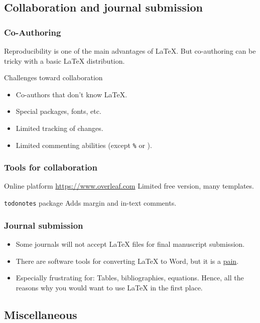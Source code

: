 \documentclass{beamer} %
\begin{document}
\subsection{Collaboration and journal submission}

\begin{frame}
\frametitle{Co-Authoring}
Reproducibility is one of the main advantages of {\LaTeX}. But co-authoring can be tricky with a basic {\LaTeX} distribution.
\begin{block}{Challenges toward collaboration}%
\begin{itemize}
\item Co-authors that don't know {\LaTeX}.
\item Special packages, fonts, etc. 
\item Limited tracking of changes.
\item Limited commenting abilities (except \texttt{\%} or ).
\end{itemize}
\end{block}
\end{frame} 
 
\begin{frame}
\frametitle{Tools for collaboration}
 \begin{block}{Online platform \url{https://www.overleaf.com}}%
Limited free version, many templates.
\end{block}
\begin{block}{\texttt{todonotes} package}
Adds margin and in-text comments.
\end{block}
\end{frame}


\begin{frame}
\frametitle{Journal submission}
\begin{itemize}
\item Some journals will not accept {\LaTeX} files for final manuscript submission. 
\item There are software tools for converting {\LaTeX} to Word, but it is a \underline{pain}.
\item Especially frustrating for: Tables, bibliographies, equations. Hence, all the reasons why you would want to use {\LaTeX} in the first place.
\end{itemize}
\end{frame}

\subsection{Miscellaneous}
\end{document}
